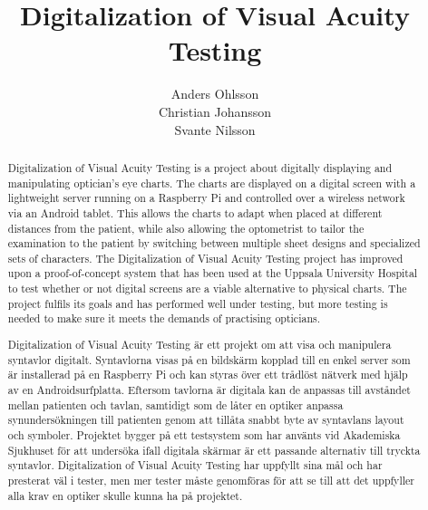 \documentclass[12pt,a4paper,notitlepage]{report}
\begin{document}

\title{Digitalization of Visual Acuity Testing}
\author{Anders Ohlsson\\Christian Johansson\\Svante Nilsson}
\maketitle

\begin{abstract}
Digitalization of Visual Acuity Testing is a project about digitally displaying and manipulating optician's eye charts. The charts are displayed on a digital screen with a lightweight server running on a Raspberry Pi and controlled over a wireless network via an Android tablet. 
This allows the charts to adapt when placed at different distances from the patient, while also allowing the optometrist to tailor the examination to the patient by switching between multiple sheet designs and specialized sets of characters. 
The Digitalization of Visual Acuity Testing project has improved upon a proof-of-concept system that has been used at the Uppsala University Hospital to test whether or not digital screens are a viable alternative to physical charts. The project fulfils its goals and has performed well under testing, but more testing is needed to make sure it meets the demands of practising opticians.
\end{abstract}
\renewcommand{\abstractname}{Sammanfattning}
\begin{abstract}
Digitalization of Visual Acuity Testing är ett projekt om att visa och manipulera syntavlor digitalt. Syntavlorna visas på en bildskärm kopplad till en enkel server som är installerad på en Raspberry Pi och kan styras över ett trådlöst nätverk med hjälp av en Androidsurfplatta. Eftersom tavlorna är digitala kan de anpassas till avståndet mellan patienten och tavlan, samtidigt som de låter en optiker anpassa synundersökningen till patienten genom att tillåta snabbt byte av syntavlans layout och symboler. Projektet bygger på ett testsystem som har använts vid Akademiska Sjukhuset för att undersöka ifall digitala skärmar är ett passande alternativ till tryckta syntavlor. Digitalization of Visual Acuity Testing har uppfyllt sina mål och har presterat väl i tester, men mer tester måste genomföras för att se till att det uppfyller alla krav en optiker skulle kunna ha på projektet.
\end{abstract}
\renewcommand\thechapter{ }
\tableofcontents*
\listoffigures
\clearpage
\end{document}
